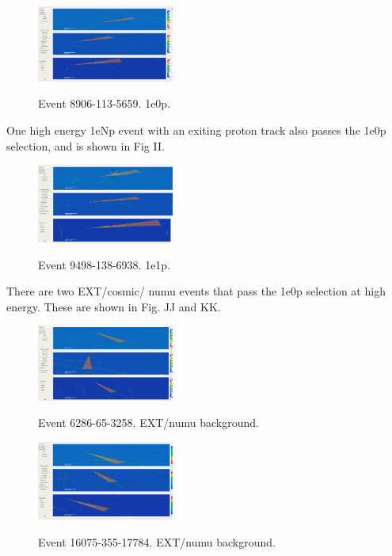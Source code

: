 \begin{figure}[H]
    \centering
    \includegraphics[width=0.4\textwidth]{1e0p/High_E_Sideband/evds/1e0p2_8906_113_5659.pdf}
    \caption{Event 8906-113-5659. 1e0p.}
    \caption{} 
    \label{fig:HE_1eNp_1}
\end{figure}

One high energy 1eNp event with an exiting proton track also passes the 1e0p selection, and is shown in Fig II.

\begin{figure}[H]
    \centering
    \includegraphics[width=0.4\textwidth]{1e0p/High_E_Sideband/evds/1eNp_9498_138_6938.pdf}
    \caption{Event 9498-138-6938. 1e1p.}
    \caption{} 
    \label{fig:HE_1eNp_1}
\end{figure} 

There are two EXT/cosmic/ numu events that pass the 1e0p selection at high energy.  These are shown in Fig. JJ and KK.

\begin{figure}[H]
    \centering
    \includegraphics[width=0.4\textwidth]{1e0p/High_E_Sideband/evds/ext1_6286_65_3258.pdf}
    \caption{Event 6286-65-3258. EXT/numu background.}
    \caption{} 
    \label{fig:HE_1eNp_1}
\end{figure} 

\begin{figure}[H]
    \centering
    \includegraphics[width=0.4\textwidth]{1e0p/High_E_Sideband/evds/ext2_16075_355_17784.pdf}
    \caption{Event 16075-355-17784. EXT/numu background.}
    \caption{} 
    \label{fig:HE_1eNp_1}
\end{figure}

